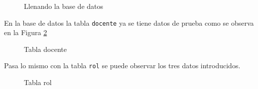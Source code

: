  \begin{figure}[H]
\caption{Llenando la base de datos}\label{fig:populating}
\centering
{}
\end{figure}
En la base de datos la tabla \texttt{docente} ya se tiene datos de prueba como se observa en la Figura \ref{fig:tableDocente}
\begin{figure}[H]
\caption{Tabla docente}\label{fig:tableDocente}
\centering
{}
\end{figure}
Pasa lo mismo con la tabla \texttt{rol} se puede observar los tres datos introducidos.
\begin{figure}[H]
\caption{Tabla rol}\label{fig:tableRol}
\centering
{}
\end{figure}
